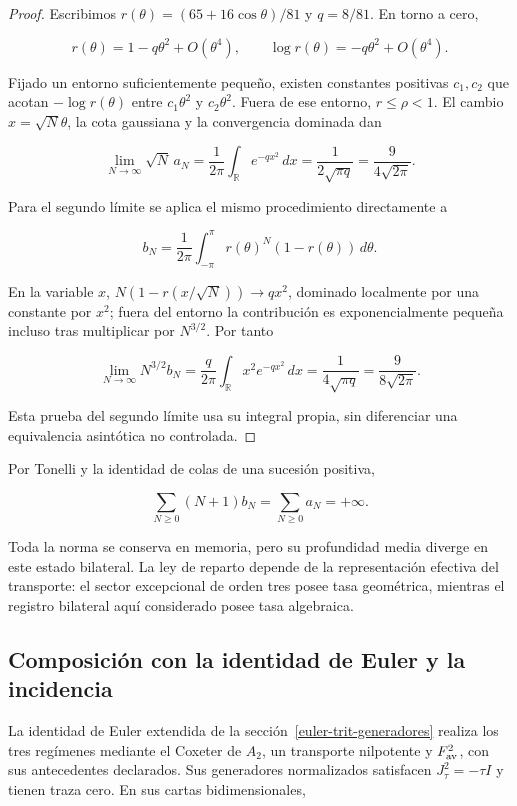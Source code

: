 \begin{proof}
Escribimos \(r(\theta)=(65+16\cos\theta)/81\) y \(q=8/81\). En torno a cero,

\[
r(\theta)=1-q\theta^2+O(\theta^4),\qquad
\log r(\theta)=-q\theta^2+O(\theta^4).
\]

Fijado un entorno suficientemente pequeño, existen constantes positivas \(c_1,c_2\) que acotan \(-\log r(\theta)\) entre \(c_1\theta^2\) y \(c_2\theta^2\). Fuera de ese entorno, \(r\leq\rho<1\). El cambio \(x=\sqrt N\theta\), la cota gaussiana y la convergencia dominada dan

\[
\lim_{N\to\infty}\sqrt N\,a_N
=\frac1{2\pi}\int_{\mathbb R}e^{-qx^2}\,dx
=\frac1{2\sqrt{\pi q}}=\frac9{4\sqrt{2\pi}}.
\]

Para el segundo límite se aplica el mismo procedimiento directamente a

\[
b_N=\frac1{2\pi}\int_{-\pi}^{\pi}r(\theta)^N(1-r(\theta))\,d\theta.
\]

En la variable \(x\), \(N(1-r(x/\sqrt N))\to qx^2\), dominado localmente por una constante por \(x^2\); fuera del entorno la contribución es exponencialmente pequeña incluso tras multiplicar por \(N^{3/2}\). Por tanto

\[
\lim_{N\to\infty}N^{3/2}b_N
=\frac q{2\pi}\int_{\mathbb R}x^2e^{-qx^2}\,dx
=\frac1{4\sqrt{\pi q}}=\frac9{8\sqrt{2\pi}}.
\]

Esta prueba del segundo límite usa su integral propia, sin diferenciar una equivalencia asintótica no controlada.
\end{proof}

Por Tonelli y la identidad de colas de una sucesión positiva,

\begin{equation}
\sum_{N\geq0}(N+1)b_N=\sum_{N\geq0}a_N=+\infty.
\label{nuc03:eq:21}
\end{equation}

Toda la norma se conserva en memoria, pero su profundidad media diverge en este estado bilateral. La ley de reparto depende de la representación efectiva del transporte: el sector excepcional de orden tres posee tasa geométrica, mientras el registro bilateral aquí considerado posee tasa algebraica.

\subsection{Composición con la identidad de Euler y la incidencia}

La identidad de Euler extendida de la sección~\ref{euler-trit-generadores} realiza los tres regímenes mediante el Coxeter de \(A_2\), un transporte nilpotente y \(F_{\rm av}^2\), con sus antecedentes declarados. Sus generadores normalizados satisfacen \(J_\tau^2=-\tau I\) y tienen traza cero. En sus cartas bidimensionales,

